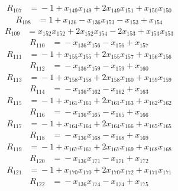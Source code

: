 \begin{align*}
R_{107}&={}-1 +x_{149}x_{149} +2x_{149}x_{151} +x_{150}x_{150}
\end{align*}
\begin{align*}
R_{108}&={}1 +x_{136} -x_{136}x_{153} -x_{153} +x_{154}
\end{align*}
\begin{align*}
R_{109}&={}x_{152}x_{152} +2x_{152}x_{154} -2x_{153} +x_{153}x_{153}
\end{align*}
\begin{align*}
R_{110}&={}-x_{136}x_{156} -x_{156} +x_{157}
\end{align*}
\begin{align*}
R_{111}&={}-1 +x_{155}x_{155} +2x_{155}x_{157} +x_{156}x_{156}
\end{align*}
\begin{align*}
R_{112}&={}-x_{136}x_{159} -x_{159} +x_{160}
\end{align*}
\begin{align*}
R_{113}&={}-1 +x_{158}x_{158} +2x_{158}x_{160} +x_{159}x_{159}
\end{align*}
\begin{align*}
R_{114}&={}-x_{136}x_{162} -x_{162} +x_{163}
\end{align*}
\begin{align*}
R_{115}&={}-1 +x_{161}x_{161} +2x_{161}x_{163} +x_{162}x_{162}
\end{align*}
\begin{align*}
R_{116}&={}-x_{136}x_{165} -x_{165} +x_{166}
\end{align*}
\begin{align*}
R_{117}&={}-1 +x_{164}x_{164} +2x_{164}x_{166} +x_{165}x_{165}
\end{align*}
\begin{align*}
R_{118}&={}-x_{136}x_{168} -x_{168} +x_{169}
\end{align*}
\begin{align*}
R_{119}&={}-1 +x_{167}x_{167} +2x_{167}x_{169} +x_{168}x_{168}
\end{align*}
\begin{align*}
R_{120}&={}-x_{136}x_{171} -x_{171} +x_{172}
\end{align*}
\begin{align*}
R_{121}&={}-1 +x_{170}x_{170} +2x_{170}x_{172} +x_{171}x_{171}
\end{align*}
\begin{align*}
R_{122}&={}-x_{136}x_{174} -x_{174} +x_{175}
\end{align*}
